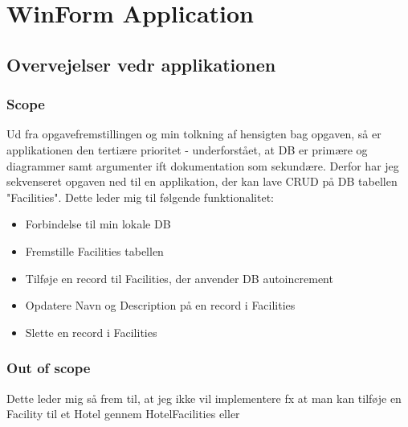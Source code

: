 \chapter{WinForm Application}

\section{Overvejelser vedr applikationen}

\subsection{Scope}
Ud fra opgavefremstillingen og min tolkning af hensigten bag opgaven, så er applikationen den tertiære prioritet - underforstået, at DB er primære og diagrammer samt argumenter ift dokumentation som sekundære.
Derfor har jeg sekvenseret opgaven ned til en applikation, der kan lave CRUD på DB tabellen "Facilities". Dette leder mig til følgende funktionalitet:

\begin{itemize}
    \item Forbindelse til min lokale DB
    \item Fremstille Facilities tabellen
    \item Tilføje en record til Facilities, der anvender DB autoincrement
    \item Opdatere Navn og Description på en record i Facilities
    \item Slette en record i Facilities
\end{itemize}

\subsection{Out of scope}
Dette leder mig så frem til, at jeg ikke vil implementere fx at man kan tilføje en Facility til et Hotel gennem HotelFacilities eller  